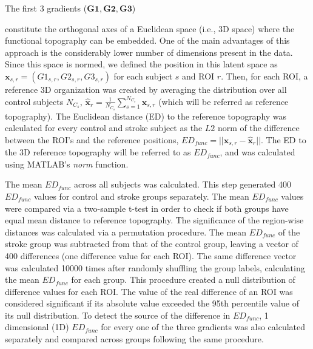 \documentclass[fleqn,10pt]{wlscirep}
\begin{document}
The first 3 gradients ($\textbf{G1},\textbf{G2},\textbf{G3}$) 
constitute the orthogonal axes of a Euclidean space (i.e., 3D space) where the functional topography can be embedded. One of the main advantages of this approach is the considerably lower number of dimensions present in the data. Since this space is normed, we defined the position in this latent space as $\textbf{x}_{s,r}=(G1_{s,r},G2_{s,r},G3_{s,r})$ for each subject $s$ and ROI $r$. Then, for each ROI, a reference 3D organization was created by averaging the distribution over all control subjects $N_{C_s}$, $\hat{\textbf{x}}_{r}=\frac{1}{N_{C_s}}\sum_{s=1 }^{N_{C_s}}\textbf{x}_{s,r}$ (which will be referred as reference topography). The Euclidean distance (ED) to the reference topography was calculated for every control and stroke subject as the $L2$ norm of the difference between the ROI's and the reference positions, $\textit{ED}_{{func}}=||\textbf{x}_{s,r}-\hat{\textbf{x}}_{r}||$. The ED to the 3D reference topography will be referred to as $\textit{ED}_{{func}}$, and was calculated using MATLAB's \emph{norm} function.

The mean $\textit{ED}_{{func}}$ across all subjects was calculated. This step generated 400 $\textit{ED}_{{func}}$ values for control and stroke groups separately. The mean $\textit{ED}_{{func}}$ values were compared via a two-sample t-test in order to check if both groups have equal mean distance to reference topography. The significance of the region-wise distances was calculated via a permutation procedure. The mean $\textit{ED}_{{func}}$ of the stroke group was subtracted from that of the control group, leaving a vector of 400 differences (one difference value for each ROI). The same difference vector was calculated 10000 times after randomly shuffling the group labels, calculating the mean   $\textit{ED}_{{func}}$ for each group. This procedure created a null distribution of difference values for each ROI. The value of the real difference of an ROI was considered significant if its absolute value exceeded the 95th percentile value of its null distribution. To detect the source of the difference in $\textit{ED}_{{func}}$, 1 dimensional (1D) $\textit{ED}_{func}$ for every one of the three gradients was also calculated separately and compared across groups following the same procedure.
\end{document}
